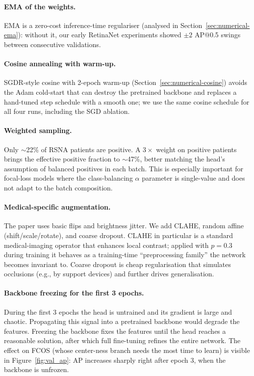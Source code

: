 \documentclass[11pt,a4paper]{article}
\begin{document}
\paragraph{EMA of the weights.}
EMA is a zero-cost inference-time regulariser (analysed in Section~\ref{sec:numerical-ema}): without it, our early RetinaNet experiments showed $\pm 2$ AP@0.5 swings between consecutive validations.

\paragraph{Cosine annealing with warm-up.}
SGDR-style cosine with 2-epoch warm-up (Section~\ref{sec:numerical-cosine}) avoids the Adam cold-start that can destroy the pretrained backbone and replaces a hand-tuned step schedule with a smooth one; we use the same cosine schedule for all four runs, including the SGD ablation.

\paragraph{Weighted sampling.}
Only $\sim$22\% of RSNA patients are positive. A $3\times$ weight on positive patients brings the effective positive fraction to $\sim$47\%, better matching the head's assumption of balanced positives in each batch. This is especially important for focal-loss models where the class-balancing $\alpha$ parameter is single-value and does not adapt to the batch composition.

\paragraph{Medical-specific augmentation.}
The paper uses basic flips and brightness jitter. We add CLAHE, random affine (shift/scale/rotate), and coarse dropout. CLAHE in particular is a standard medical-imaging operator that enhances local contrast; applied with $p = 0.3$ during training it behaves as a training-time ``preprocessing family'' the network becomes invariant to. Coarse dropout is cheap regularisation that simulates occlusions (e.g., by support devices) and further drives generalisation.

\paragraph{Backbone freezing for the first 3 epochs.}
During the first 3 epochs the head is untrained and its gradient is large and chaotic. Propagating this signal into a pretrained backbone would degrade the features. Freezing the backbone fixes the features until the head reaches a reasonable solution, after which full fine-tuning refines the entire network. The effect on FCOS (whose center-ness branch needs the most time to learn) is visible in Figure~\ref{fig:val_ap}: AP increases sharply right after epoch 3, when the backbone is unfrozen.
\end{document}
